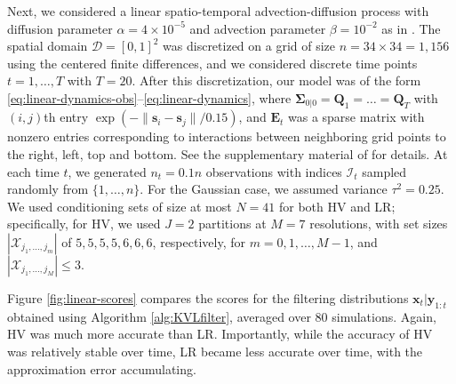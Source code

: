 \documentclass[12pt,letterpaper]{article}
\theoremstyle{propstyle}
\theoremstyle{propstyle}
\theoremstyle{propstyle}
\theoremstyle{propstyle}
\theoremstyle{propstyle}
\newcommand{\bs}{\mathbf{s}}
\newcommand{\bx}{\mathbf{x}}
\newcommand{\by}{\mathbf{y}}
\newcommand{\bE}{\mathbf{E}}
\newcommand{\bQ}{\mathbf{Q}}
\newcommand{\bfzero}{\mathbf{0}}
\newcommand{\bfSigma}{\bm{\Sigma}}
\newcommand{\der}[1]{\tfrac{\partial}{\partial #1}}
\newcommand{\sx}{\mathcal{X}}
\newcommand{\domain}{\mathcal{D}}
\newcommand{\jm}{{j_1,\ldots,j_m}}
\newcommand{\jM}{{j_1,\ldots,j_M}}
\newcommand{\obs}{\mathcal{I}}
\begin{document}
Next, we considered a linear spatio-temporal advection-diffusion process with diffusion parameter $\alpha = 4 \times 10^{-5}$ and advection parameter $\beta = 10^{-2}$ as in \citet{Jurek2018}. The spatial domain $\domain = [0,1]^2$ was discretized on a grid of size $n=34 \times 34 = 1{,}156$ using the centered finite differences, and we considered discrete time points $t=1,\ldots,T$ with $T=20$. After this discretization, our model was of the form \eqref{eq:linear-dynamics-obs}--\eqref{eq:linear-dynamics}, where $\bfSigma_{0|0}=\bQ_1=\ldots=\bQ_T$ with $(i,j)$th entry $\exp(-\|\bs_i - \bs_j\|/0.15)$, and $\bE_t$ was a sparse matrix with nonzero entries corresponding to interactions between neighboring grid points to the right, left, top and bottom. See the supplementary material of \citet{Jurek2018} for details.
At each time $t$, we generated $n_t = 0.1 n$ observations with indices $\obs_t$ sampled randomly from $\{1,\ldots,n\}$. For the Gaussian case, we assumed variance $\tau^2=0.25$.
We used conditioning sets of size at most $N=41$ for both HV and LR; specifically, for HV, we used $J=2$ partitions at $M=7$ resolutions, with set sizes $|\sx_\jm|$ of $5, 5, 5, 5, 6, 6, 6$, respectively, for $m=0,1,\ldots,M-1$, and $|\sx_\jM| \leq 3$.

Figure \ref{fig:linear-scores} compares the scores for the filtering distributions $\bx_t | \by_{1:t}$ obtained using Algorithm \ref{alg:KVLfilter}, averaged over 80 simulations. Again, HV was much more accurate than LR. Importantly, while the accuracy of HV was relatively stable over time, LR became less accurate over time, with the approximation error accumulating.
\end{document}
